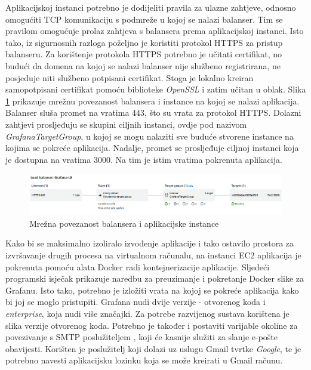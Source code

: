 Aplikacijskoj instanci potrebno je dodijeliti pravila za ulazne zahtjeve, odnosno omogućiti TCP komunikaciju s podmreže u kojoj se nalazi balanser. Tim se pravilom omogućuje prolaz zahtjeva s balansera prema aplikacijskoj instanci. Isto tako, iz sigurnosnih razloga poželjno je koristiti protokol HTTPS za pristup balanseru. Za korištenje protokola HTTPS potrebno je učitati certifikat, no budući da domena na kojoj se nalazi balanser nije službeno registrirana, ne posjeduje niti službeno potpisani certifikat. Stoga je lokalno kreiran samopotpisani certifikat pomoću biblioteke \textit{OpenSSL} i zatim učitan u oblak. Slika \ref{fig:load_balancer} prikazuje mrežnu povezanost balansera i instance na kojoj se nalazi aplikacija. Balanser sluša promet na vratima 443, što su vrata za protokol HTTPS. Dolazni zahtjevi prosljeđuju se skupini ciljnih instanci, ovdje pod nazivom \textit{GrafanaTargetGroup}, u kojoj se mogu nalaziti sve buduće stvorene instance na kojima se pokreće aplikacija. Nadalje, promet se prosljeđuje ciljnoj instanci koja je dostupna na vratima 3000. Na tim je istim vratima pokrenuta aplikacija. 

\begin{figure}[ht]
	\centering
	\includegraphics[scale=0.7]{imgs/load_balancer}
	\caption{Mrežna povezanost balansera i aplikacijske instance}
	\label{fig:load_balancer}
\end{figure}

Kako bi se maksimalno izoliralo izvođenje aplikacije i tako ostavilo prostora za izvršavanje drugih procesa na virtualnom računalu, na instanci EC2 aplikacija je pokrenuta pomoću alata Docker radi kontejnerizacije aplikacije. Sljedeći programski isječak prikazuje naredbu za preuzimanje i pokretanje Docker slike za Grafanu. Isto tako, potrebno je izložiti vrata na kojoj se pokreće aplikacija kako bi joj se moglo pristupiti. Grafana nudi dvije verzije - otvorenog koda i \textit{enterprise}, koja nudi više značajki. Za potrebe razvijenog sustava korištena je slika verzije otvorenog koda. Potrebno je također i postaviti varijable okoline za povezivanje s SMTP poslužiteljem , koji će kasnije služiti za slanje e-pošte obavijesti. Korišten je poslužitelj koji dolazi uz uslugu Gmail tvrtke \textit{Google}, te je potrebno navesti aplikacijsku lozinku koja se može kreirati u Gmail računu.

